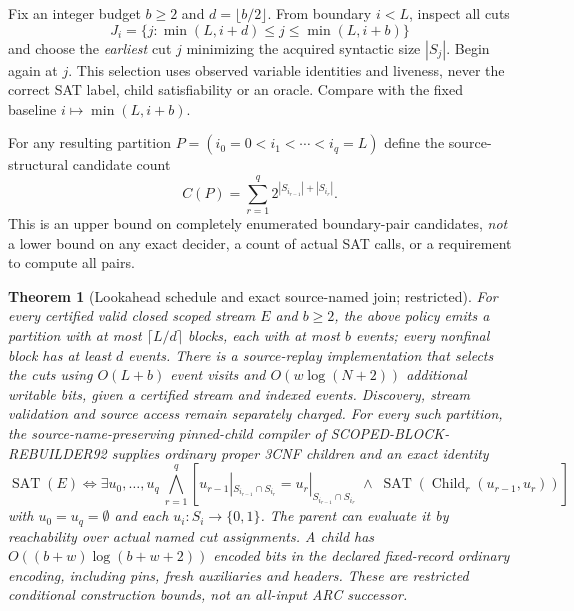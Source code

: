 \documentclass[11pt]{article}
\newtheorem{theorem}{Theorem}
\begin{document}
Fix an integer budget $b\ge2$ and $d=\lfloor b/2\rfloor$. From boundary $i<L$, inspect all cuts
\[
J_i=\{j:\min(L,i+d)\le j\le \min(L,i+b)\}
\]
and choose the \emph{earliest} cut $j$ minimizing the acquired syntactic size $|S_j|$. Begin again at $j$. This selection uses observed variable identities and liveness, never the correct SAT label, child satisfiability or an oracle. Compare with the fixed baseline $i\mapsto\min(L,i+b)$.

For any resulting partition $P=(i_0=0<i_1<\cdots<i_q=L)$ define the source-structural candidate count
\[
C(P)=\sum_{r=1}^q 2^{|S_{i_{r-1}}|+|S_{i_r}|}.
\]
This is an upper bound on completely enumerated boundary-pair candidates, \emph{not} a lower bound on any exact decider, a count of actual SAT calls, or a requirement to compute all pairs.

\begin{theorem}[Lookahead schedule and exact source-named join; restricted]
For every certified valid closed scoped stream $E$ and $b\ge2$, the above policy emits a partition with at most $\lceil L/d\rceil$ blocks, each with at most $b$ events; every nonfinal block has at least $d$ events. There is a source-replay implementation that selects the cuts using $O(L+b)$ event visits and $O(w\log(N+2))$ additional writable bits, given a certified stream and indexed events. Discovery, stream validation and source access remain separately charged. For every such partition, the source-name-preserving pinned-child compiler of SCOPED-BLOCK-REBUILDER92 supplies \emph{ordinary proper 3CNF} children and an exact identity
\[
\operatorname{SAT}(E)\iff
\exists u_0,\ldots,u_q\
\bigwedge_{r=1}^q\left[
u_{r-1}|_{S_{i_{r-1}}\cap S_{i_r}}=
u_r|_{S_{i_{r-1}}\cap S_{i_r}}
\;\land\;
\operatorname{SAT}(\operatorname{Child}_r(u_{r-1},u_r))
\right]
\]
with $u_0=u_q=\emptyset$ and each $u_i:S_i\to\{0,1\}$. The parent can evaluate it by reachability over actual named cut assignments. A child has $O((b+w)\log(b+w+2))$ encoded bits in the declared fixed-record ordinary encoding, including pins, fresh auxiliaries and headers. These are restricted conditional construction bounds, \emph{not} an all-input ARC successor.
\end{theorem}
\end{document}
